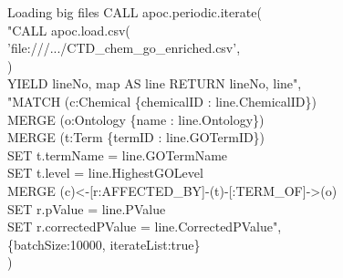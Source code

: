 \documentclass[12pt]{beamer}
\begin{document}
    \begin{frame}{Loading big files}
        CALL apoc.periodic.iterate(\\
        \hspace{1cm} "CALL apoc.load.csv(\\
        \hspace{3cm} 'file:///.../CTD\_chem\_go\_enriched.csv',\\
        \hspace{1cm} {})\\
        \hspace{1cm} YIELD lineNo, map AS line RETURN lineNo, line",\\
        \hspace{1cm} "MATCH (c:Chemical \{chemicalID : line.ChemicalID\})\\
        \hspace{1cm} MERGE (o:Ontology \{name : line.Ontology\})\\
        \hspace{1cm} MERGE (t:Term \{termID : line.GOTermID\})\\
        \hspace{3cm} SET t.termName = line.GOTermName\\
        \hspace{3cm} SET t.level = line.HighestGOLevel\\
        \hspace{1cm} MERGE (c)\textless-[r:AFFECTED\_BY]-(t)-[:TERM\_OF]-\textgreater(o)\\
        \hspace{2cm} SET r.pValue = line.PValue\\
        \hspace{2cm} SET r.correctedPValue = line.CorrectedPValue",\\
        \hspace{1cm} \{batchSize:10000, iterateList:true\}\\
        )
    \end{frame}
    
    
\end{document}
